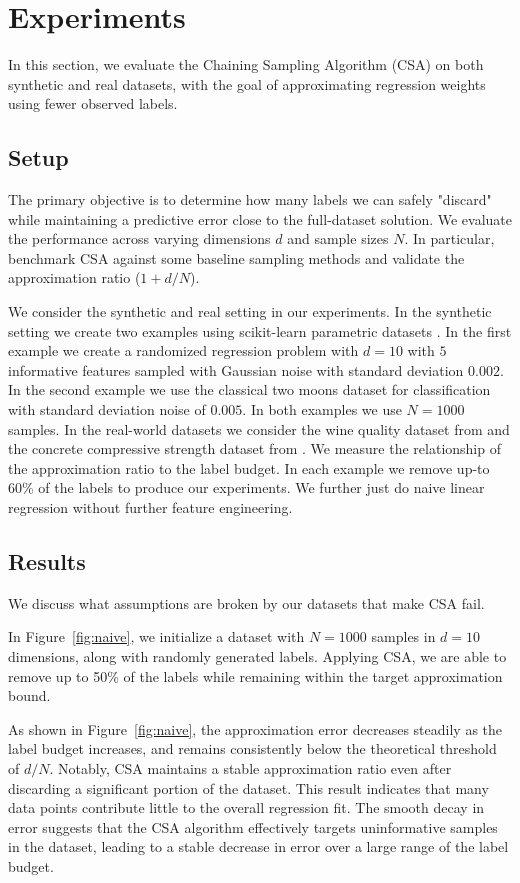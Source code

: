 \section{Experiments}
In this section, we evaluate the Chaining Sampling Algorithm (CSA) on both synthetic and real datasets, with the goal of approximating regression weights using fewer observed labels.

\subsection{Setup}
The primary objective is to determine how many labels we can safely "discard" while maintaining a predictive error close to the full-dataset solution. We evaluate the performance across varying dimensions $d$ and sample sizes $N$. In particular, benchmark CSA against some baseline sampling methods and validate the approximation ratio (\(1 + d/N\)).

We consider the synthetic and real setting in our experiments.
In the synthetic setting we create two examples using scikit-learn parametric datasets \citep{scikit-learn}. In the first example we create a randomized regression problem with \(d=10\) with \(5\) informative features sampled with Gaussian noise with standard deviation \(0.002\). In the second example we use the classical two moons dataset for classification with standard deviation noise of \(0.005\). In both examples we use \(N=1000\) samples.
In the real-world datasets we consider the wine quality dataset from \citet{wine_quality_186} and the concrete compressive strength dataset from \citet{concrete_compressive_strength_165}.
We measure the relationship of the approximation ratio to the label budget. In each example we remove up-to 60\% of the labels to produce our experiments. We further just do naive linear regression without further feature engineering.

\subsection{Results}
We discuss what assumptions are broken by our datasets that make CSA fail.

In Figure~\ref{fig:naive}, we initialize a dataset with $N = 1000$ samples in $d = 10$ dimensions, along with randomly generated labels. Applying CSA, we are able to remove up to 50\% of the labels while remaining within the target approximation bound.

As shown in Figure~\ref{fig:naive}, the approximation error decreases steadily as the label budget increases, and remains consistently below the theoretical threshold of $d/N$. Notably, CSA maintains a stable approximation ratio even after discarding a significant portion of the dataset. This result indicates that many data points contribute little to the overall regression fit. The smooth decay in error suggests that the CSA algorithm effectively targets uninformative samples in the dataset, leading to a stable decrease in error over a large range of the label budget. 

